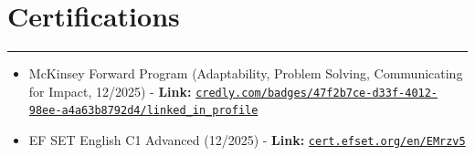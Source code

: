 \documentclass[10pt,a4paper]{article}
\begin{document}
\section*{Certifications}
\hrule \vspace{2mm}
\begin{itemize}[nosep]
    \item McKinsey Forward Program (Adaptability, Problem Solving, Communicating for Impact, 12/2025) - \textbf{Link:} \href{https://www.credly.com/badges/47f2b7ce-d33f-4012-98ee-a4a63b8792d4/linked_in_profile}{\nolinkurl{credly.com/badges/47f2b7ce-d33f-4012-98ee-a4a63b8792d4/linked_in_profile}}
    \item EF SET English C1 Advanced (12/2025) - \textbf{Link:} \href{https://cert.efset.org/en/EMrzv5}{\nolinkurl{cert.efset.org/en/EMrzv5}}
\end{itemize}
\end{document}
